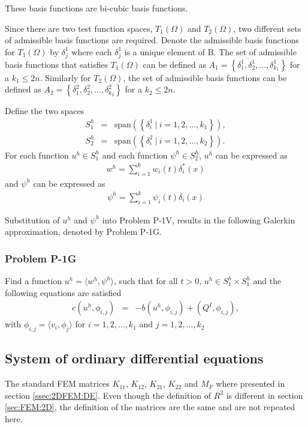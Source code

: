 \documentclass[../../main.tex]{subfiles}
\begin{document}
These basis functions are bi-cubic basis functions.

Since there are two test function spaces, $T_1(\Omega)$ and $T_2(\Omega)$, two different sets of admissible basis functions are required. Denote the admissible basis functions for $T_1(\Omega)$ by $\delta^1_j$ where each $\delta^1_j$ is a unique element of B. The set of admissible basis functions that satisfies $T_1(\Omega)$ can be defined as $A_1 = \left\{\delta^1_1, \delta^1_2,..., \delta^1_{k_1} \right\}$ for a $k_1 \leq 2n$. Similarly for $T_2(\Omega)$, the set of admissible basis functions can be defined as $A_2 = \left\{\delta^2_1, \delta^2_2,..., \delta^2_{k_2} \right\}$ for a $k_2 \leq 2n$.

Define the two spaces
\begin{eqnarray*}
	S^h_1 & = & \textrm{span}\left(\left\{\delta^1_i \ | \ i = 1,2,...,k_1 \right\} \right),\\
	S^h_2 & = & \textrm{span}\left(\left\{\delta^2_i \ | \ i = 1,2,...,k_2 \right\} \right).
\end{eqnarray*}
For each function $u^h \in S_1^h$ and each function $\psi^h \in S_2^h$, $u^h$ can be expressed as
\begin{eqnarray*}
	w^h = \sum_{i = 1}^{k} w_i(t) \delta^*_{i}(x)
\end{eqnarray*} and $\psi^h$ can be expressed as
\begin{eqnarray*}
	\psi^h = \sum_{i = 1}^{k} \psi_i(t) \delta_{i}(x)
\end{eqnarray*}

Substitution of $u^h$ and $\psi^h$ into Problem P-1V, results in the following Galerkin approximation, denoted by Problem P-1G.

\subsubsection{Problem P-1G}
Find a function $u^h = \langle w^h, \psi^h \rangle$, such that for all $t>0$, $u^h \in S_1^h \times S_1^h$ and the following equations are satisfied
\begin{eqnarray}
	c(u^h,\phi_{i,j}) &=& -b(u^h,\phi_{i,j}) + (Q^I,\phi_{i,j}), \label{eq:P_Model:ProblemP1V1}
\end{eqnarray} with $\phi_{i,j} = \langle v_i, \phi_j \rangle$ for $i = 1,2,...,k_1$ and $j = 1,2,...,k_2$

\subsection{System of ordinary differential equations}\label{plate_fem_g}
The standard FEM matrices $K_{11}$, $K_{12}$, $K_{21}$, $K_{22}$ and $M_F$ where presented in section \ref{ssec:2DFEM:DE}. Even though the definition of $R^2$ is different in section \ref{sec:FEM:2D}, the definition of the matrices are the same and are not repeated here.
\end{document}
